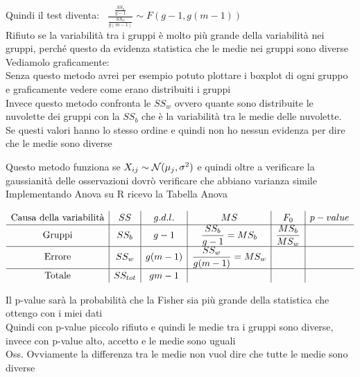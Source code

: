 Quindi il test diventa: \ $\frac{\frac{SS_b}{g-1}}{\frac{SS_w}{g(m-1)}} \sim F(g-1,g(m-1))$\skipp\\
Rifiuto se la variabilità tra i gruppi è molto più grande della variabilità nei gruppi, perché questo da evidenza statistica che le medie nei gruppi sono diverse\\

Vediamolo graficamente:\\
Senza questo metodo avrei per esempio potuto plottare i boxplot di ogni gruppo e graficamente vedere come erano distribuiti i gruppi\\
Invece questo metodo confronta le $SS_w$ ovvero quante sono distribuite le nuvolette dei gruppi con la $SS_b$ che è la variabilità tra le medie delle nuvolette.\\
Se questi valori hanno lo stesso ordine e quindi non ho nessun evidenza per dire che le medie sono diverse\\

Questo metodo funziona se $X_{ij}\sim \mathcal N (\mu_j,\sigma^2)$ e quindi oltre a verificare la gaussianità delle osservazioni dovrò verificare che abbiano varianza simile\\



Implementando Anova su R ricevo la Tabella Anova

\[
{\renewcommand\arraystretch{1.2} 
\begin{array}{c|c|c|c|c|c}

     \text{Causa della variabilità} & SS & g.d.l. & MS & F_0 & p-value \\
     \hline
      \text{Gruppi} & SS_b & g-1 & \frac{SS_b}{g-1}=MS_b & \frac{MS_b}{MS_w}&\\
     \hline
     \text{Errore} & SS_w & g(m-1) & \frac{SS_w}{g(m-1)}=MS_w &  & \\
     \hline
     \text{Totale} & SS_{tot} & gm-1 &  &  &
\end{array}
}
\]

Il p-value sarà la probabilità che la Fisher sia più grande della statistica che ottengo con i miei dati\\

Quindi con p-value piccolo rifiuto e quindi le medie tra i gruppi sono diverse, invece con p-value alto, accetto e le medie sono uguali\\

Oss. Ovviamente la differenza tra le medie non vuol dire che tutte le medie sono diverse\\

